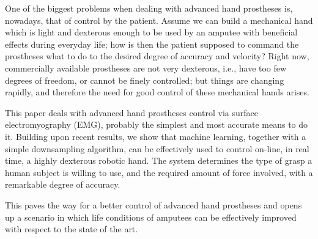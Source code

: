 One of the biggest problems when dealing with advanced hand prostheses
is, nowadays, that of control by the patient. Assume we can build a
mechanical hand which is light and dexterous enough to be used by an
amputee with beneficial effects during everyday life; how is then the
patient supposed to command the prostheses what to do to the desired
degree of accuracy and velocity? Right now, commercially available
prostheses are not very dexterous, i.e., have too few degrees of
freedom, or cannot be finely controlled; but things are changing
rapidly, and therefore the need for good control of these mechanical
hands arises.

This paper deals with advanced hand prostheses control via surface
electromyography (EMG), probably the simplest and most accurate means
to do it. Building upon recent results, we show that machine learning,
together with a simple downsampling algorithm, can be effectively used
to control on-line, in real time, a highly dexterous robotic hand. The
system determines the type of grasp a human subject is willing to use,
and the required amount of force involved, with a remarkable degree of
accuracy.

This paves the way for a better control of advanced hand prostheses
and opens up a scenario in which life conditions of amputees can be
effectively improved with respect to the state of the art.
